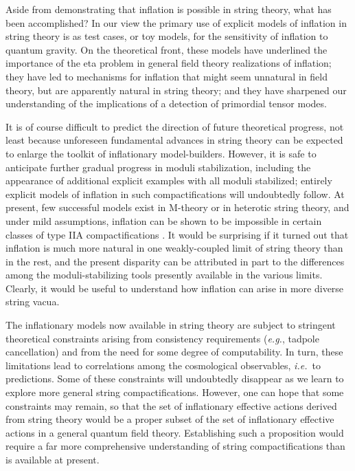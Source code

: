 \documentclass[12pt,letterpaper,rotate]{article}
\begin{document}
{Aside from demonstrating that inflation is possible in string theory, what has been accomplished? In our view  the primary use of explicit models of inflation in string theory is as test cases, or toy models,
for the sensitivity of inflation to quantum gravity. On the theoretical front, these models have underlined the importance of the eta problem in general field theory realizations of inflation; they have led to mechanisms for inflation that might seem unnatural in field theory, but are apparently natural in string theory; and they have sharpened our understanding of the implications of a detection of primordial tensor modes.

It is of course difficult to predict the direction of future theoretical progress, not least because unforeseen fundamental advances in string theory can be expected to enlarge the toolkit of inflationary model-builders.
However, it is safe to anticipate further gradual progress in moduli stabilization, including the appearance of additional explicit examples with all moduli stabilized; entirely explicit models of inflation in such compactifications will undoubtedly follow.
At present, few successful models exist in M-theory or in heterotic string theory,
and under mild assumptions, inflation can be shown to be impossible in certain classes of type IIA compactifications \cite{Hertzberg:2007wc, Flauger:2008ad, Caviezel:2008tf}. It would be surprising if it turned out that inflation is much more natural in one weakly-coupled limit of string theory than in the rest, and the present disparity can be attributed in part to the differences among the moduli-stabilizing tools presently available in the various limits. Clearly, it would be useful to understand how inflation can arise in more diverse string vacua.

The inflationary models now available in string theory are subject to stringent theoretical constraints arising from consistency requirements ({\it e.g.}, tadpole cancellation) and from the need for some degree of computability. In turn, these limitations lead to correlations among the cosmological observables, {\it i.e.}~to predictions.  Some of these constraints will undoubtedly disappear as we learn to explore more general string compactifications. However, one can hope that some constraints may remain, so that the set of inflationary effective actions derived from string theory would be a proper subset of the set of inflationary effective actions in  a general quantum field theory.  Establishing such a proposition would require a far more comprehensive understanding of string compactifications than is available at present.



}
\end{document}
